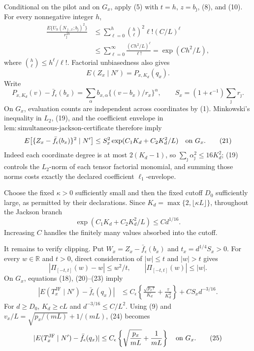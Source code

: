 Conditional on the pilot and on \(G_x\), apply (5) with \(t=h\), \(z=b_\jmath\), (8), and (10).  For every nonnegative integer \(h\),
\[
 \begin{split}
 \frac{E\{U_h(N_{\jmath,x};b_\jmath)^2\}}{r_\jmath^{2h}}
 &\leq\sum_{\ell=0}^h\binom h\ell^2\ell!(C/L)^\ell\\
 &\leq\sum_{\ell=0}^{\infty}\frac{(Ch^2/L)^\ell}{\ell!}
 =\exp(Ch^2/L),
 \end{split}                                                       \tag{19}
\]
where \(\binom h\ell\leq h^\ell/\ell!\).  Factorial unbiasedness also gives
\[
 E(Z_x\mid N')=P_{x,K_d}(q_x).                                    \tag{20}
\]
Write
\[
 P_{x,K_d}(v)-\bar f_\epsilon(b_x)
 =\sum_\alpha b_{x,\alpha}\{(v-b_x)/r_x\}^\alpha,
 \qquad
 S_x=(1+\epsilon^{-1})\sum_\jmath r_\jmath.
\]
On \(G_x\), evaluation counts are independent across coordinates by (1).  Minkowski's inequality in \(L_2\), (19), and the coefficient envelope in \(\mathrm{lem:simultaneous\mbox{-}jackson\mbox{-}certificate}\) therefore imply
\[
 E\!\left[\{Z_x-\bar f_\epsilon(b_x)\}^2\mid N'\right]
 \leq S_x^2\exp(C_1K_d+C_2K_d^2/L)
 \quad\hbox{on }G_x.                                               \tag{21}
\]
Indeed each coordinate degree is at most \(2(K_d-1)\), so \(\sum_\jmath\alpha_\jmath^2\leq16K_d^2\); (19) controls the \(L_2\)-norm of each tensor factorial monomial, and summing those norms costs exactly the declared coefficient \(\ell_1\)-envelope.

Choose the fixed \(\kappa>0\) sufficiently small and then the fixed cutoff \(D_0\) sufficiently large, as permitted by their declarations.  Since \(K_d=\max\{2,\lfloor\kappa L\rfloor\}\), throughout the Jackson branch
\[
 \exp(C_1K_d+C_2K_d^2/L)\leq C d^{1/16}.                           \tag{22}
\]
Increasing \(C\) handles the finitely many values absorbed into the cutoff.

It remains to verify clipping.  Put \(W_x=Z_x-\bar f_\epsilon(b_x)\) and \(t_x=d^{1/4}S_x>0\).  For every \(w\in\mathbb R\) and \(t>0\), direct consideration of \(|w|\leq t\) and \(|w|>t\) gives
\[
 |\Pi_{[-t,t]}(w)-w|\leq w^2/t,
 \qquad |\Pi_{[-t,t]}(w)|\leq|w|.                                \tag{23}
\]
On \(G_x\), equations (18), (20)--(23) imply
\[
 \begin{split}
 |E(T_x^{\mathrm{JF}}\mid N')-\bar f_\epsilon(q_x)|
 &\leq C_\epsilon\left\{
 \frac{\sqrt{p_x\tau}}{K_d}+\frac{\tau}{K_d^2}\right\}
   +CS_xd^{-3/16}.
 \end{split}                                                       \tag{24}
\]
For \(d\geq D_0\), \(K_d\geq cL\) and \(d^{-3/16}\leq C/L^2\).  Using (9) and \(v_x/L=\sqrt{p_x/(mL)}+1/(mL)\), (24) becomes
\[
 |E(T_x^{\mathrm{JF}}\mid N')-\bar f_\epsilon(q_x)|
 \leq C_\epsilon\left\{\sqrt{\frac{p_x}{mL}}+\frac1{mL}\right\}
 \quad\hbox{on }G_x.                                              \tag{25}
\]

